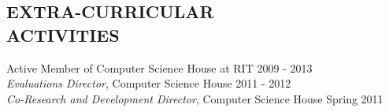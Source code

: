 \documentclass[line,margin]{res}
\begin{document}
\begin{resume}
\section{EXTRA-CURRICULAR \\ ACTIVITIES}             
           Active Member of Computer Science House at RIT \hfill 2009 - 2013 \\
	{\it Evaluations Director}, Computer Science House \hfill 2011 - 2012 \\
	{\it Co-Research and Development Director}, Computer Science House \hfill Spring 2011

 

\end{resume}
\end{document}

